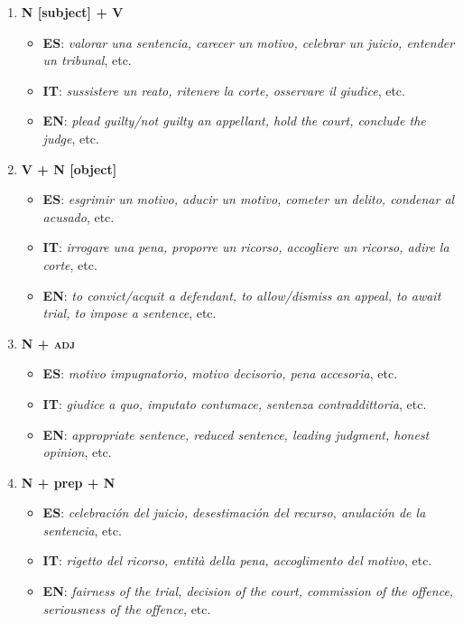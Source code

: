 \documentclass[output=paper]{LSP/langsci}
\begin{document}
\begin{enumerate}
\item\textbf{ N [subject] + V}
\begin{itemize}
\item \textbf{ES}: \textit{valorar una sentencia, carecer un motivo, celebrar un juicio, entender un tribunal}, etc.
\item \textbf{IT}: \textit{sussistere un reato, ritenere la corte, osservare il giudice}, etc.
\item \textbf{EN}: \textit{plead guilty/not guilty an appellant, hold the court, conclude the judge}, etc.
\end{itemize}
\item \textbf{V + N [object]}
\begin{itemize}
\item \textbf{ES}: \textit{esgrimir un motivo, aducir un motivo, cometer un delito, condenar al acusado}, etc.
\item \textbf{IT}: \textit{irrogare una pena, proporre un ricorso, accogliere un ricorso, adire la corte}, etc.
\item \textbf{EN}: \textit{to convict/acquit a defendant, to allow/dismiss an appeal, to await trial, to impose a sentence}, etc.
\end{itemize}
\item \textbf{N + \textsc{adj}}
\begin{itemize}
\item \textbf{ES}: \textit{motivo impugnatorio, motivo decisorio, pena accesoria}, etc.
\item \textbf{IT}: \textit{giudice a quo, imputato contumace, sentenza contraddittoria}, etc.
\item \textbf{EN}: \textit{appropriate sentence, reduced sentence, leading judgment, honest opinion}, etc.
\end{itemize}
\item \textbf{N + prep + N}
\begin{itemize}
\item \textbf{ES}: \textit{celebración del juicio, desestimación del recurso, anulación de la sentencia}, etc.
\item \textbf{IT}: \textit{rigetto del ricorso, entità della pena, accoglimento del motivo}, etc.
\item \textbf{EN}: \textit{fairness of the trial, decision of the court, commission of the offence, seriousness of the offence}, etc.
\end{itemize}
\end{enumerate}
\end{document}
